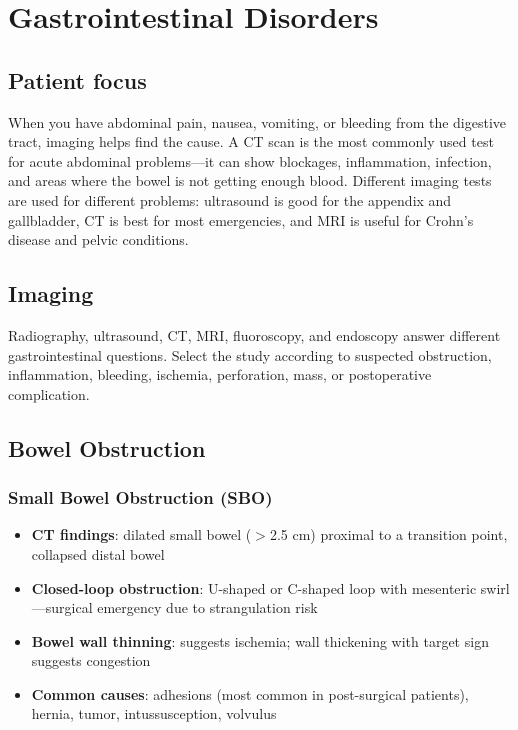\chapter{Gastrointestinal Disorders}

\section*{Patient focus}
When you have abdominal pain, nausea, vomiting, or bleeding from the digestive tract, imaging helps find the cause. A CT scan is the most commonly used test for acute abdominal problems---it can show blockages, inflammation, infection, and areas where the bowel is not getting enough blood. Different imaging tests are used for different problems: ultrasound is good for the appendix and gallbladder, CT is best for most emergencies, and MRI is useful for Crohn's disease and pelvic conditions.


\label{ch:ch63_gi_disorders}

\section{Imaging}
Radiography, ultrasound, CT, MRI, fluoroscopy, and endoscopy answer different gastrointestinal questions. Select the study according to suspected obstruction, inflammation, bleeding, ischemia, perforation, mass, or postoperative complication.

\section{Bowel Obstruction}

\subsection{Small Bowel Obstruction (SBO)}
\begin{itemize}
  \item \textbf{CT findings}: dilated small bowel ($>$2.5 cm) proximal to a transition point, collapsed distal bowel
  \item \textbf{Closed-loop obstruction}: U-shaped or C-shaped loop with mesenteric swirl---surgical emergency due to strangulation risk
  \item \textbf{Bowel wall thinning}: suggests ischemia; wall thickening with target sign suggests congestion
  \item \textbf{Common causes}: adhesions (most common in post-surgical patients), hernia, tumor, intussusception, volvulus
\end{itemize}

